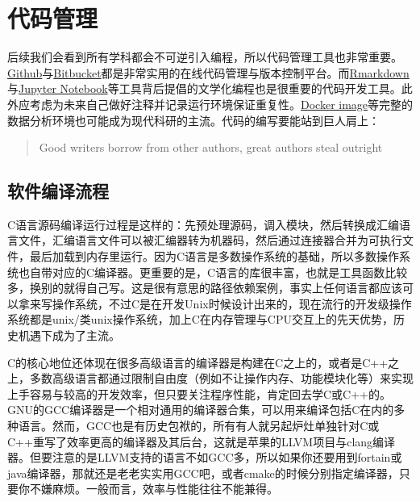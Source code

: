 \documentclass[]{tufte-book}
\begin{document}
\hypertarget{ux4ee3ux7801ux7ba1ux7406}{%
\section*{代码管理}\label{ux4ee3ux7801ux7ba1ux7406}}

后续我们会看到所有学科都会不可逆引入编程，所以代码管理工具也非常重要。\href{https://github.com/}{Github}与\href{https://bitbucket.org/}{Bitbucket}都是非常实用的在线代码管理与版本控制平台。而\href{https://rmarkdown.rstudio.com/}{Rmarkdown}与\href{https://ipython.org/notebook.html}{Jupyter Notebook}等工具背后提倡的文学化编程也是很重要的代码开发工具。此外应考虑为未来自己做好注释并记录运行环境保证重复性。\href{https://docs.docker.com/get-started/}{Docker image}等完整的数据分析环境也可能成为现代科研的主流。代码的编写要能站到巨人肩上：

\begin{quote}
Good writers borrow from other authors, great authors steal outright
\end{quote}

\hypertarget{ux8f6fux4ef6ux7f16ux8bd1ux6d41ux7a0b}{%
\subsection{软件编译流程}\label{ux8f6fux4ef6ux7f16ux8bd1ux6d41ux7a0b}}

C语言源码编译运行过程是这样的：先预处理源码，调入模块，然后转换成汇编语言文件，汇编语言文件可以被汇编器转为机器码，然后通过连接器合并为可执行文件，最后加载到内存里运行。因为C语言是多数操作系统的基础，所以多数操作系统也自带对应的C编译器。更重要的是，C语言的库很丰富，也就是工具函数比较多，换别的就得自己写。这是很有意思的路径依赖案例，事实上任何语言都应该可以拿来写操作系统，不过C是在开发Unix时候设计出来的，现在流行的开发级操作系统都是unix/类unix操作系统，加上C在内存管理与CPU交互上的先天优势，历史机遇下成为了主流。

C的核心地位还体现在很多高级语言的编译器是构建在C之上的，或者是C++之上，多数高级语言都通过限制自由度（例如不让操作内存、功能模块化等）来实现上手容易与较高的开发效率，但只要关注程序性能，肯定回去学C或C++的。GNU的GCC编译器是一个相对通用的编译器合集，可以用来编译包括C在内的多种语言。然而，GCC也是有历史包袱的，所有有人就另起炉灶单独针对C或C++重写了效率更高的编译器及其后台，这就是苹果的LLVM项目与clang编译器。但要注意的是LLVM支持的语言不如GCC多，所以如果你还要用到fortain或java编译器，那就还是老老实实用GCC吧，或者cmake的时候分别指定编译器，只要你不嫌麻烦。一般而言，效率与性能往往不能兼得。
\end{document}
